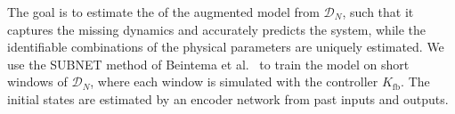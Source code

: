 The goal is to estimate the  of the
augmented model from $\mathcal D_N$, such that it captures the missing
dynamics and accurately predicts the system, while the identifiable
combinations of the physical parameters are uniquely estimated.
We use the SUBNET method of Beintema et
al.~\cite{beintema2023subnet} to train the model on short windows of
$\mathcal D_N$, where each window is simulated with the controller
$K_{\mathrm{fb}}$.
The initial states are estimated by an encoder network from past inputs and outputs.
